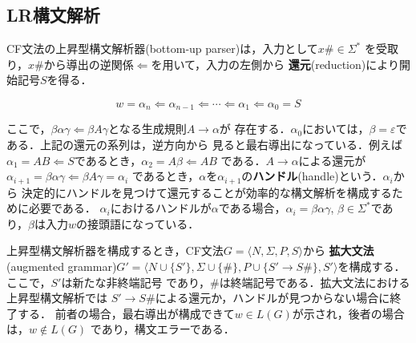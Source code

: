 \documentclass[dvipdfmx,a4j]{jbook}
\begin{document}
\subsection{LR構文解析}

CF文法の上昇型構文解析器(bottom-up parser)は，入力として$x\texttt{\#}\in\Sigma^\ast$
を受取り，$x\texttt{\#}$から導出の逆関係$\Leftarrow$を用いて，入力の左側から
{\bf 還元}(reduction)により開始記号$S$を得る．

\[w=\alpha_{n}\Leftarrow\alpha_{n-1}\Leftarrow\cdots\Leftarrow\alpha_1\Leftarrow\alpha_0=S\]

ここで，$\beta\alpha\gamma\Leftarrow\beta A\gamma$となる生成規則$A\rightarrow\alpha$が
存在する．$\alpha_0$においては，$\beta=\varepsilon$である．上記の還元の系列は，逆方向から
見ると最右導出になっている．例えば$\alpha_1=AB\Leftarrow S$であるとき，$\alpha_2=A\beta\Leftarrow AB$
である．$A\rightarrow\alpha$による還元が$\alpha_{i+1}=\beta\alpha\gamma\Leftarrow\beta A\gamma=\alpha_i$
であるとき，$\alpha$を$\alpha_{i+1}$の{\bf ハンドル}(handle)という．$\alpha_i$から
決定的にハンドルを見つけて還元することが効率的な構文解析を構成するために必要である．
$\alpha_i$におけるハンドルが$\alpha$である場合，$\alpha_i=\beta\alpha\gamma$, 
$\beta\in\Sigma^\ast$であり，$\beta$は入力$w$の接頭語になっている．

上昇型構文解析器を構成するとき，CF文法$G=\langle N,\Sigma,P,S\rangle$から
{\bf 拡大文法}(augmented grammar)$G'=\langle N\cup\{S'\},\Sigma\cup\{\texttt{\#}\},
P\cup\{S'\rightarrow S\#\},S'\rangle$を構成する．ここで，$S'$は新たな非終端記号
であり，$\texttt{\#}$は終端記号である．拡大文法における上昇型構文解析では
$S'\rightarrow S\texttt{\#}$による還元か，ハンドルが見つからない場合に終了する．
前者の場合，最右導出が構成できて$w\in L(G)$が示され，後者の場合は，$w\notin L(G)$
であり，構文エラーである．
\end{document}
